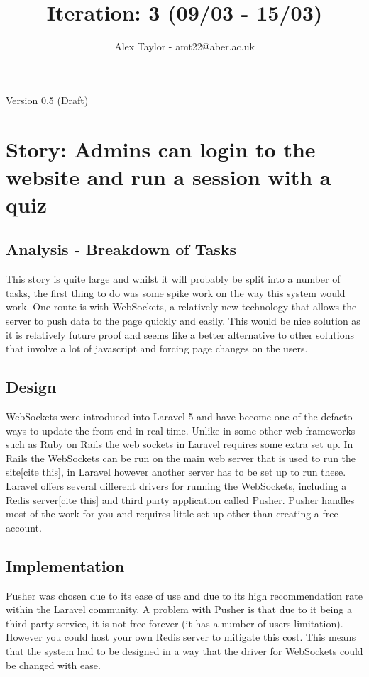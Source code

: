 \documentclass{article}
\title{Iteration: 3 (09/03 - 15/03)}
\author{Alex Taylor - amt22@aber.ac.uk}
\begin{document}
\maketitle
\begin{center}
	Version 0.5 (Draft)
\end{center}
\tableofcontents
\thispagestyle{empty}
\newpage

\section{Story: Admins can login to the website and run a session with a quiz}
\subsection{Analysis - Breakdown of Tasks}
This story is quite large and whilst it will probably be split into a number of tasks, the first thing to do was some spike work on the way this system would work. One route is with WebSockets, a relatively new technology that allows the server to push data to the page quickly and easily. This would be nice solution as it is relatively future proof and seems like a better alternative to other solutions that involve a lot of javascript and forcing page changes on the users.
\subsection{Design}
WebSockets were introduced into Laravel 5 and have become one of the defacto ways to update the front end in real time. Unlike in some other web frameworks such as Ruby on Rails the web sockets in Laravel requires some extra set up. In Rails the WebSockets can be run on the main web server that is used to run the site[cite this], in Laravel however another server has to be set up to run these. Laravel offers several different drivers for running the WebSockets, including a Redis server[cite this] and  third party application called Pusher. Pusher handles most of the work for you and requires little set up other than creating a free account. 
\subsection{Implementation}
Pusher was chosen due to its ease of use and due to its high recommendation rate within the Laravel community. A problem with Pusher is that due to it being a third party service, it is not free forever (it has a number of users limitation). However you could host your own Redis server to mitigate this cost. This means that the system had to be designed in a way that the driver for WebSockets could be changed with ease.
\end{document}
